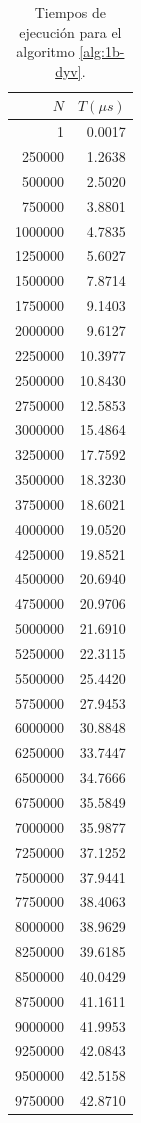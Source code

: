\begin{table}
	\footnotesize
	\centering
	\begin{tabular}{|r|r|}
        \hline
        $N$ & $T(\mu s)$ \\
        \hline
		1 & 0.0017 \\ 
		250000 & 1.2638 \\ 
		500000 & 2.5020 \\ 
		750000 & 3.8801 \\ 
		1000000 & 4.7835 \\ 
		1250000 & 5.6027 \\ 
		1500000 & 7.8714 \\ 
		1750000 & 9.1403 \\ 
		2000000 & 9.6127 \\ 
		2250000 & 10.3977 \\ 
		2500000 & 10.8430 \\ 
		2750000 & 12.5853 \\ 
		3000000 & 15.4864 \\ 
		3250000 & 17.7592 \\ 
		3500000 & 18.3230 \\ 
		3750000 & 18.6021 \\ 
		4000000 & 19.0520 \\ 
		4250000 & 19.8521 \\ 
		4500000 & 20.6940 \\ 
		4750000 & 20.9706 \\ 
		5000000 & 21.6910 \\ 
		5250000 & 22.3115 \\ 
		5500000 & 25.4420 \\ 
		5750000 & 27.9453 \\ 
		6000000 & 30.8848 \\ 
		6250000 & 33.7447 \\ 
		6500000 & 34.7666 \\ 
		6750000 & 35.5849 \\ 
		7000000 & 35.9877 \\ 
		7250000 & 37.1252 \\ 
		7500000 & 37.9441 \\ 
		7750000 & 38.4063 \\ 
		8000000 & 38.9629 \\ 
		8250000 & 39.6185 \\ 
		8500000 & 40.0429 \\ 
		8750000 & 41.1611 \\ 
		9000000 & 41.9953 \\ 
		9250000 & 42.0843 \\ 
		9500000 & 42.5158 \\ 
		9750000 & 42.8710 \\ 
        \hline
	\end{tabular}
    \caption{Tiempos de ejecución para el algoritmo \ref{alg:1b-dyv}.}
    \label{tab:1b-dyv}
\end{table}

